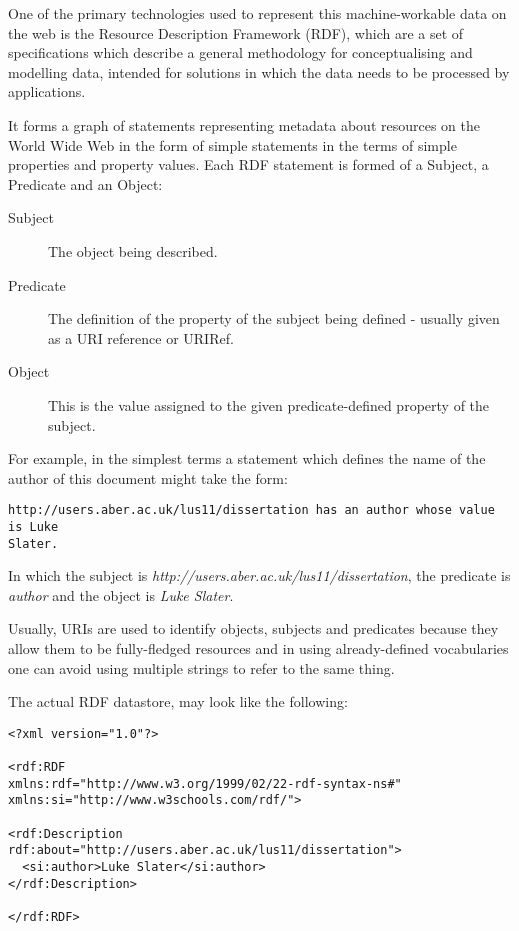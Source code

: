 \documentclass{article}
\begin{document}
One of the primary technologies used to represent this machine-workable data on
the web is the Resource Description Framework (RDF), which are a set of
specifications which describe a general methodology for conceptualising and
modelling data, intended for solutions in which the data needs to be processed
by applications.

It forms a graph of statements representing metadata about resources on the
World Wide Web in the form of simple statements in the terms of simple
properties and property values. Each RDF statement is formed of a Subject, a
Predicate and an Object:

\begin{description}
    \item[Subject] The object being described.
    \item[Predicate] The definition of the property of the subject being
    defined - usually given as a URI reference or URIRef.
    \item[Object] This is the value assigned to the given
    predicate-defined property of the subject.
\end{description}

For example, in the simplest terms a statement which defines the name of the author of
this document might take the form:

\begin{lstlisting}
http://users.aber.ac.uk/lus11/dissertation has an author whose value is Luke
Slater.
\end{lstlisting}

In which the subject is \emph{http://users.aber.ac.uk/lus11/dissertation}, the
predicate is \emph{author} and the object is \emph{Luke Slater}.

Usually, URIs are used to identify objects, subjects and predicates because they
allow them to be fully-fledged resources and in using already-defined
vocabularies one can avoid using multiple strings to refer to the same thing.

The actual RDF datastore, may look like the following:

\begin{lstlisting}
<?xml version="1.0"?>

<rdf:RDF
xmlns:rdf="http://www.w3.org/1999/02/22-rdf-syntax-ns#"
xmlns:si="http://www.w3schools.com/rdf/">

<rdf:Description rdf:about="http://users.aber.ac.uk/lus11/dissertation">
  <si:author>Luke Slater</si:author>
</rdf:Description>

</rdf:RDF> 
\end{lstlisting}
\end{document}
